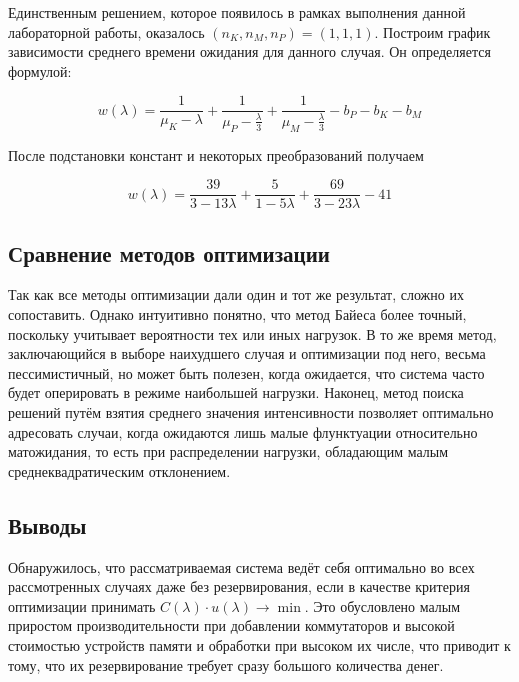 \documentclass[12pt, a4paper] {ncc}
\begin{document}
Единственным решением, которое появилось в рамках выполнения данной лабораторной
работы, оказалось $(n_K, n_M, n_P) = (1, 1, 1)$. Построим график зависимости
среднего времени ожидания для данного случая. Он определяется формулой:

$$w(\lambda) = \dfrac{1}{\mu_K - \lambda} +
              \dfrac{1}{\mu_P - \frac \lambda 3} +
              \dfrac{1}{\mu_M - \frac \lambda 3} - b_P - b_K - b_M$$

После подстановки констант и некоторых преобразований получаем

$$w(\lambda) = \dfrac{39}{3 - 13\lambda} + \dfrac{5}{1 - 5\lambda} +
               \dfrac{69}{3 - 23\lambda} - 41$$


\subsection{Сравнение методов оптимизации}

Так как все методы оптимизации дали один и тот же результат, сложно их
сопоставить. Однако интуитивно понятно, что метод Байеса более точный, поскольку
учитывает вероятности тех или иных нагрузок. В то же время метод, заключающийся
в выборе наихудшего случая и оптимизации под него, весьма пессимистичный, но
может быть полезен, когда ожидается, что система часто будет оперировать в
режиме наибольшей нагрузки. Наконец, метод поиска решений путём взятия среднего
значения интенсивности позволяет оптимально адресовать случаи, когда ожидаются
лишь малые флунктуации относительно матожидания, то есть при распределении
нагрузки, обладающим малым среднеквадратическим отклонением.

\subsection{Выводы}

Обнаружилось, что рассматриваемая система ведёт себя оптимально во всех
рассмотренных случаях даже без резервирования, если в качестве критерия
оптимизации принимать $C(\lambda) \cdot u(\lambda) \rightarrow \min$. Это
обусловлено малым приростом производительности при добавлении коммутаторов и
высокой стоимостью устройств памяти и обработки при высоком их числе, что
приводит к тому, что их резервирование требует сразу большого количества денег.
\end{document}
